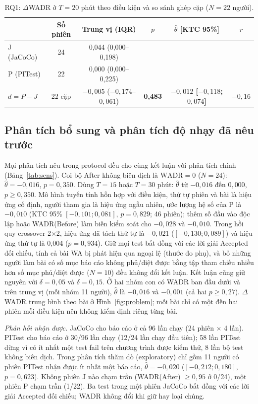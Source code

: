 \begin{table}[t]
\centering
\caption{RQ1: $\Delta$WADR ở $T = 20$ phút theo điều kiện và so sánh ghép cặp ($N = 22$ người).}
\label{tab:main}
\begin{tabular}{lccccc}
\hline
 & Số phiên & Trung vị (IQR) & $p$ & $\hat{\theta}$ [KTC 95\%] & $r$ \\
\hline
J (JaCoCo) & 24 & 0,044 (0,000--0,198) & & & \\
P (PITest) & 22 & 0,000 (0,000--0,225) & & & \\
$d = P - J$ & 22 cặp & $-0,005$ ($-0,174$--$0,061$) & \textbf{0,483} & \textbf{$-0,012$ [$-0,118$; $0,074$]} & $-0,16$ \\
\hline
\end{tabular}
\end{table}

\subsection{Phân tích bổ sung và phân tích độ nhạy đã nêu trước}
Mọi phân tích nêu trong protocol đều cho cùng kết luận với phân tích chính (Bảng~\ref{tab:sens}).
Coi bộ After không biên dịch là $\mathrm{WADR} = 0$ ($N = 24$): $\hat{\theta} = -0,016$, $p = 0,350$.
Dùng $T = 15$ hoặc $T = 30$ phút: $\hat{\theta}$ từ $-0,016$ đến $0,000$, $p \geq 0,350$.
Mô hình tuyến tính hỗn hợp với điều kiện, thứ tự phiên và bài là hiệu ứng cố định, người tham gia là hiệu ứng ngẫu nhiên, ước lượng hệ số của P là $-0,010$ (KTC 95\% $[-0,101; 0,081]$, $p = 0,829$; 46 phiên); thêm số đầu vào độc lập hoặc WADR(Before) làm biến kiểm soát cho $-0,028$ và $-0,010$.
Trong hồi quy crossover 2$\times$2, hiệu ứng đã tách thứ tự là $-0,021$ ($[-0,130; 0,089]$) và hiệu ứng thứ tự là 0,004 ($p = 0,934$).
Giữ mọi test bất đồng với các lời giải Accepted đối chiếu, tính cả bài WA bị phát hiện qua ngoại lệ (thước đo phụ), và bỏ những người làm bài có số mục báo cáo không phủ/diệt được bằng tập tham chiếu nhiều hơn số mục phủ/diệt được ($N = 10$) đều không đổi kết luận.
Kết luận cũng giữ nguyên với $\delta = 0,05$ và $\delta = 0,15$.
Ở hai nhóm con có WADR ban đầu dưới và trên trung vị (mỗi nhóm 11 người), $\hat{\theta}$ là $-0,016$ và $-0,001$ (cả hai $p \geq 0,27$).
$\Delta$WADR trung bình theo bài ở Hình~\ref{fig:problem}; mỗi bài chỉ có một đến hai phiên mỗi điều kiện nên không kiểm định riêng từng bài.

\textit{Phản hồi nhận được.} JaCoCo cho báo cáo ở cả 96 lần chạy (24 phiên $\times$ 4 lần).
PITest cho báo cáo ở 30/96 lần chạy (12/24 lần chạy đầu tiên); 58 lần PITest dừng vì có ít nhất một test fail trên chương trình được kiểm thử, 8 lần bộ test không biên dịch.
Trong phân tích thăm dò (exploratory) chỉ gồm 11 người có phiên PITest nhận được ít nhất một báo cáo, $\hat{\theta} = -0,020$ ($[-0,212; 0,180]$, $p = 0,623$).
Không phiên J nào chạm trần (WADR(After) $\geq 0,95$ ở 0/24), một phiên P chạm trần (1/22).
Ba test trong một phiên JaCoCo bất đồng với các lời giải Accepted đối chiếu; WADR không đổi khi giữ hay loại chúng.

